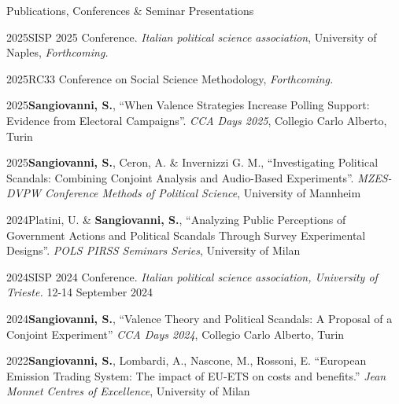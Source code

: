 \documentclass{cv} %
\begin{document}
\begin{rSection}{Publications, Conferences \& Seminar Presentations}
\subtitle{Conferences \& Seminar Presentations}

\begin{rPresSection}{2025}{SISP 2025 Conference. \textit{Italian political science association}, University of Naples, \textit{Forthcoming.}}
\end{rPresSection}\vspace{-0.2cm}
\begin{rPresSection}{2025}{RC33 Conference on Social Science Methodology, \textit{Forthcoming.}} 
\end{rPresSection}\vspace{-0.2cm}
\begin{rPresSection}{2025}{\textbf{Sangiovanni, S.}, “When Valence Strategies Increase Polling Support: Evidence from Electoral Campaigns”. \textit{CCA Days 2025}, Collegio Carlo Alberto, Turin}
\end{rPresSection}\vspace{-0.2cm}
\begin{rPresSection}{2025}{\textbf{Sangiovanni, S.}, Ceron, A. \& Invernizzi G. M., “Investigating Political Scandals: Combining Conjoint Analysis and Audio-Based Experiments”. \textit{MZES-DVPW Conference Methods of Political Science}, University of Mannheim}
\end{rPresSection}\vspace{-0.2cm}
\begin{rPresSection}{2024}{Platini, U. \& \textbf{Sangiovanni, S.}, “Analyzing Public Perceptions of Government Actions and Political Scandals Through Survey Experimental Designs”. \textit{POLS PIRSS Seminars Series}, University of Milan}
\end{rPresSection}\vspace{-0.2cm}
\begin{rPresSection}{2024}{SISP 2024 Conference. \textit{Italian political science association, University of Trieste.} 12-14 September 2024}
\end{rPresSection}\vspace{-0.2cm}
\begin{rPresSection}{2024}{\textbf{Sangiovanni, S.}, “Valence Theory and Political Scandals: A Proposal of a Conjoint Experiment” \textit{CCA Days 2024}, Collegio Carlo Alberto, Turin}
\end{rPresSection}\vspace{-0.2cm}
\begin{rPresSection}{2022}{\textbf{Sangiovanni, S.}, Lombardi, A., Nascone, M., Rossoni, E. “European Emission Trading System: The impact of EU-ETS on costs and benefits.” \textit{Jean Monnet Centres of Excellence}, University of Milan}
\end{rPresSection}


\end{rSection}
\end{document}
